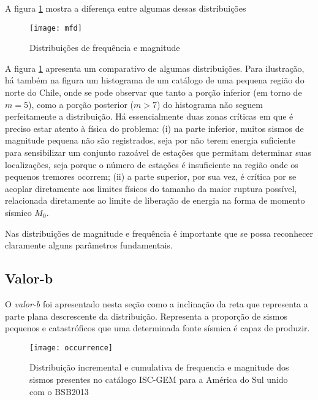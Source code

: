 A figura \ref{f:mfd} mostra a diferença entre algumas dessas distribuições

\begin{figure}[H]
   \centering
   \texttt{[image: mfd]}
   \caption[Distribuições de frequência e magnitude]
   		   {Distribuições de frequência e magnitude} 
   \label{f:mfd}
\end{figure} 

A figura \ref{f:mfd} apresenta um comparativo de algumas distribuições. Para ilustração, 
há também na figura um histograma de um catálogo de
uma pequena região do norte do Chile, onde se pode observar que tanto a porção inferior (em torno de $m=5$), como a porção
posterior ($m > 7$) do histograma não seguem perfeitamente a distribuição. Há essencialmente duas zonas críticas em que é preciso
estar atento à física do problema:
(i) na parte inferior, muitos sismos de magnitude pequena não são registrados, seja por não terem energia suficiente
para sensibilizar um conjunto razoável de estações que permitam determinar suas localizações, seja porque o número de
estações é insuficiente na região onde os pequenos tremores ocorrem; (ii) a parte superior, por sua vez, é crítica
por se acoplar diretamente aos limites físicos do tamanho da maior ruptura possível, relacionada diretamente ao limite de liberação de energia na forma de momento sísmico $M_0$.

Nas distribuições de magnitude e frequência é importante que se possa reconhecer claramente alguns parâmetros
fundamentais.

\subsection{Valor-b}
\label{sec:b_value}

O \emph{valor-b} foi apresentado nesta seção como a inclinação da reta que representa a parte plana descrescente da
distribuição. Representa a proporção de sismos pequenos e catastróficos que uma determinada fonte sísmica é capaz de
produzir.


\begin{figure}[H]
   \centering
   \texttt{[image: occurrence]}
   \caption[Distribuição incremental e cumulativa de frequencia e magnitude dos sismos presentes no catálogo ISC-GEM
   para a América do Sul unido com o BSB2013]
   {Distribuição incremental e cumulativa de frequencia e magnitude dos sismos presentes no catálogo ISC-GEM
   para a América do Sul unido com o BSB2013} 
   \label{f:occurrence}
\end{figure} 
 





